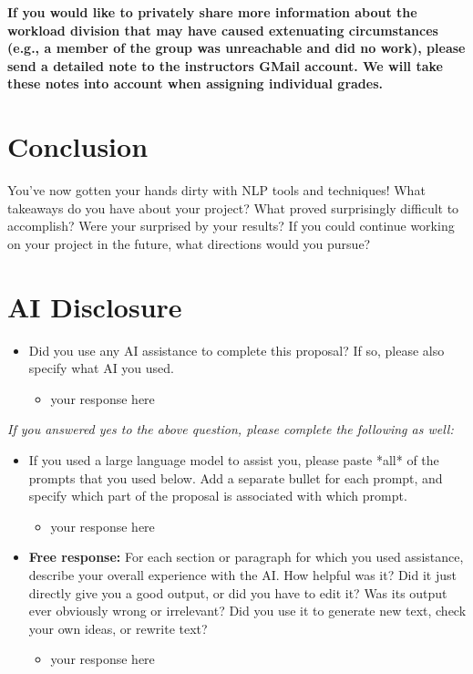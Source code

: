 \documentclass[11pt,a4paper]{article}
\begin{document}
\textbf{If you would like to privately share more information about the workload division that may have caused extenuating circumstances (e.g., a member of the group was unreachable and did no work), please send a detailed note to the instructors GMail account. We will take these notes into account when assigning individual grades.}

\section{Conclusion}
You've now gotten your hands dirty with NLP tools and techniques! What takeaways do you have about your project? What proved surprisingly difficult to accomplish? Were your surprised by your results? If you could continue working on your project in the future, what directions would you pursue?

\section{AI Disclosure}
\begin{itemize}
    \item Did you use any AI assistance to complete this proposal? If so, please also specify what AI you used.
    \begin{itemize}
        \item your response here
    \end{itemize}
\end{itemize}

\noindent\textit{If you answered yes to the above question, please complete the following as well:}

\begin{itemize}
    \item  If you used a large language model to assist you, please paste *all* of the prompts that you used below. Add a separate bullet for each prompt, and specify which part of the proposal is associated with which prompt.
    \begin{itemize}
        \item your response here
    \end{itemize}
    \item \textbf{Free response:} For each section or paragraph for which you used assistance, describe your overall experience with the AI. How helpful was it? Did it just directly give you a good output, or did you have to edit it? Was its output ever obviously wrong or irrelevant? Did you use it to generate new text, check your own ideas, or rewrite text?
    \begin{itemize}
        \item your response here
    \end{itemize}
\end{itemize}



\footnotesize

\end{document}
